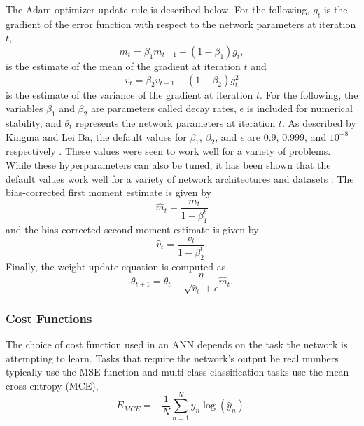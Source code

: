 The Adam optimizer update rule is described below. For the following, $g_t$ is the gradient of the error function with respect to the network parameters at iteration $t$, 
\begin{equation} \label{eq:adam1}
m_t = \beta_1 m_{t-1} + (1 - \beta_1) g_t,
\end{equation}
is the estimate of the mean of the gradient at iteration $t$ and
\begin{equation} \label{eq:adam2}
v_t = \beta_2 v_{t-1} + (1 - \beta_2) g_t^2
\end{equation}
is the estimate of the variance of the gradient at iteration $t$. For the following, the variables $\beta_1$ and $\beta_2$ are parameters called decay rates, $\epsilon$ is included for numerical stability, and $\theta_t$ represents the network parameters at iteration $t$. As described by Kingma and Lei Ba, the default values for $\beta_1$, $\beta_2$, and $\epsilon$ are 0.9, 0.999, and $10^{-8}$ respectively \cite{Kingma2015}. These values were seen to work well for a variety of problems. While these hyperparameters can also be tuned, it has been shown that the default values work well for a variety of network architectures and datasets \cite{Kingma2015}. The bias-corrected first moment estimate is given by
\begin{equation} \label{eq:adam3}
\hat{m}_t = \dfrac{m_t}{1 - \beta^t_1}
\end{equation}
and the bias-corrected second moment estimate is given by 
\begin{equation} \label{eq:adam4}
\hat{v}_t = \dfrac{v_t}{1 - \beta^t_2}.
\end{equation}
Finally, the weight update equation is computed as
\begin{equation} \label{eq:adam5}
\theta_{t+1} = \theta_{t} - \dfrac{\eta}{\sqrt{\hat{v}_t} + \epsilon} \hat{m}_t.
\end{equation}


\subsubsection{Cost Functions}

The choice of cost function used in an ANN depends on the task the network is attempting to learn. Tasks that require the network's output be real numbers typically use the MSE function and multi-class classification tasks use the mean cross entropy (MCE),
%
\begin{equation} \label{eq:CrossEntropy}
E_{MCE} = -{\frac{1} N} \sum_{n=1}^N y_n \log(\hat{y}_n).
\end{equation}
%

